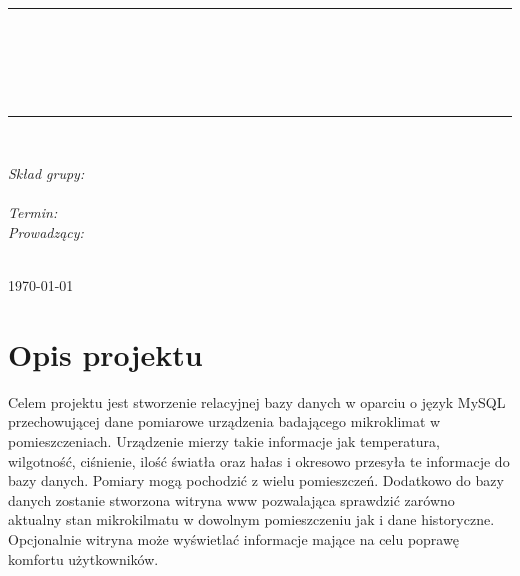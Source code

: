 \documentclass[10pt, a4paper]{article}
\begin{document}
\def\tablename{Tabela}	%

\begin{titlepage}
	\begin{center}
		\textsc{\LARGE \formakursu}\\[1cm]		
		\textsc{\Large \kurs}\\[0.5cm]		
		\rule{\textwidth}{0.08cm}\\[0.4cm]
		{\huge \bfseries \doctype}\\[1cm]
		{\huge \bfseries \projectname}\\[0.5cm]
		{\huge \bfseries \acronim}\\[0.4cm]
		\rule{\textwidth}{0.08cm}\\[1cm]
		
		\begin{flushright} \large
		\emph{Skład grupy:}\\
		\osobaA\\[0.4cm]

		
		\emph{Termin: }\termin\\[0.4cm]

		\emph{Prowadzący:} \\
		\prowadzacy \\
		
		\end{flushright}
		
		\vfill
		
		{\large \today}
	\end{center}	
\end{titlepage}

\newpage

\section{Opis projektu}
\label{sec:OpisProjektu}

Celem projektu jest stworzenie relacyjnej bazy danych w oparciu o język MySQL przechowującej dane pomiarowe urządzenia badającego mikroklimat w pomieszczeniach. Urządzenie mierzy takie informacje jak temperatura, wilgotność, ciśnienie, ilość światła oraz hałas i okresowo przesyła te informacje do bazy danych. Pomiary mogą pochodzić z wielu pomieszczeń.
Dodatkowo do bazy danych zostanie stworzona witryna www pozwalająca sprawdzić zarówno aktualny stan mikrokilmatu w dowolnym pomieszczeniu jak i dane historyczne. Opcjonalnie witryna może wyświetlać informacje mające na celu poprawę komfortu użytkowników.
\end{document}
